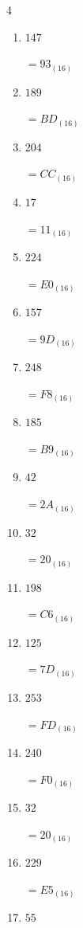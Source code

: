 \begin{multicols}{4}
\begin{enumerate}
  \item $147$

        $=93_{(16)}$

  \item $189$

        $=BD_{(16)}$

  \item $204$

        $=CC_{(16)}$

  \item $17$

        $=11_{(16)}$

  \item $224$

        $=E0_{(16)}$

  \item $157$

        $=9D_{(16)}$

  \item $248$

        $=F8_{(16)}$

  \item $185$

        $=B9_{(16)}$

  \item $42$

        $=2A_{(16)}$

  \item $32$

        $=20_{(16)}$

  \item $198$

        $=C6_{(16)}$

  \item $125$

        $=7D_{(16)}$

  \item $253$

        $=FD_{(16)}$

  \item $240$

        $=F0_{(16)}$

\columnbreak %

  \item $32$

        $=20_{(16)}$

  \item $229$

        $=E5_{(16)}$

  \item $55$


\end{enumerate}
\end{multicols}
